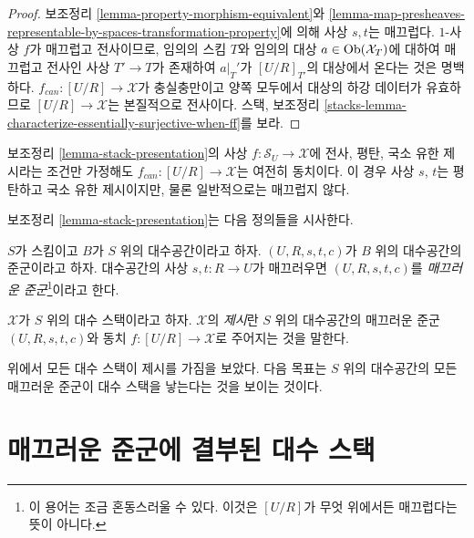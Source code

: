 \begin{proof}
보조정리 \ref{lemma-property-morphism-equivalent}와
\ref{lemma-map-presheaves-representable-by-spaces-transformation-property}에
의해 사상 $s, t$는 매끄럽다. $1$-사상 $f$가 매끄럽고 전사이므로, 임의의
스킴 $T$와 임의의 대상 $a \in \mathop{\mathrm{Ob}}\nolimits(\mathcal{X}_T)$에 대하여 매끄럽고
전사인 사상 $T' \to T$가 존재하여 $a|_T'$가 $[U/R]_{T'}$의 대상에서
온다는 것은 명백하다. $f_{can} : [U/R] \to \mathcal{X}$가 충실충만이고
양쪽 모두에서 대상의 하강 데이터가 유효하므로
$[U/R] \to \mathcal{X}$는 본질적으로 전사이다. 스택, 보조정리
\ref{stacks-lemma-characterize-essentially-surjective-when-ff}를 보라.
\end{proof}

\begin{remark}
\label{remark-flat-fp-presentation}
보조정리 \ref{lemma-stack-presentation}의 사상
$f : \mathcal{S}_U \to \mathcal{X}$에 전사, 평탄, 국소 유한 제시라는
조건만 가정해도 $f_{can} : [U/R] \to \mathcal{X}$는 여전히 동치이다. 이
경우 사상 $s$, $t$는 평탄하고 국소 유한 제시이지만, 물론 일반적으로는
매끄럽지 않다.
\end{remark}

\noindent
보조정리 \ref{lemma-stack-presentation}는 다음 정의들을 시사한다.

\begin{definition}
\label{definition-smooth-groupoid}
$S$가 스킴이고 $B$가 $S$ 위의 대수공간이라고 하자.
$(U, R, s, t, c)$가 $B$ 위의 대수공간의 준군이라고 하자. 대수공간의
사상 $s, t : R \to U$가 매끄러우면 $(U, R, s, t, c)$를
{\it 매끄러운 준군}\footnote{이 용어는 조금 혼동스러울 수 있다. 이것은
$[U/R]$가 무엇 위에서든 매끄럽다는 뜻이 아니다.}이라고 한다.
\end{definition}

\begin{definition}
\label{definition-presentation}
$\mathcal{X}$가 $S$ 위의 대수 스택이라고 하자. $\mathcal{X}$의
{\it 제시}란 $S$ 위의 대수공간의 매끄러운 준군 $(U, R, s, t, c)$와 동치
$f : [U/R] \to \mathcal{X}$로 주어지는 것을 말한다.
\end{definition}

\noindent
위에서 모든 대수 스택이 제시를 가짐을 보았다. 다음 목표는 $S$ 위의
대수공간의 모든 매끄러운 준군이 대수 스택을 낳는다는 것을 보이는 것이다.


\section{매끄러운 준군에 결부된 대수 스택}
\label{section-smooth-groupoid-gives-algebraic-stack}

